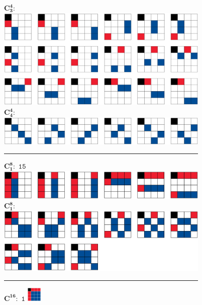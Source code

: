 \documentclass[11pt,xcolor=dvipsnames]{beamer}
\begin{document}
\begin{frame}
\begin{columns}
\begin{column}{.49\textwidth}
\begin{figure}
		\end{figure}
	\end{column}
	\begin{column}{.49\textwidth}
		\begin{figure}
			$\boldsymbol{\text{C}_3^4}:$ \hfill \hfill \newline
			\includegraphics[width=\textwidth]{img-congreso/C34.png} \newline
			$\boldsymbol{\text{C}_4^4}:$ \hfill \hfill \newline
			\includegraphics[width=\textwidth]{img-congreso/C44.png}
			\hrule
			\vspace{1mm}
			$\boldsymbol{\text{C}_1^8}:$ \hfill $\mathtt{15}$ \newline
			\includegraphics[width=\textwidth]{img-congreso/C18.png} \newline
			$\boldsymbol{\text{C}_1^8}:$ \hfill \hfill \newline
			\includegraphics[width=\textwidth]{img-congreso/C28.png} 
			\hrule
			$\boldsymbol{\text{C}^{16}}:$ \hfill $\mathtt{1}$ \newline
			\includegraphics[width=7mm]{img-congreso/C0.png} \hfill \hfill
		\end{figure}
		\vfill
	\end{column}
\end{columns}
	\vfill
\end{frame}
\end{document}
